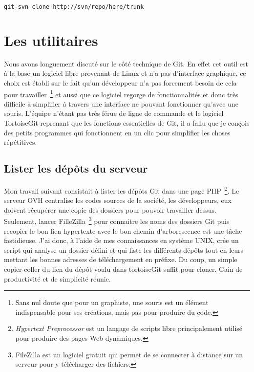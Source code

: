 \begin{lstlisting}
git-svn clone http://svn/repo/here/trunk
\end{lstlisting}

\section{Les utilitaires} %

Nous avons longuement discuté sur le côté technique de Git. En effet cet outil
est à la base un logiciel libre provenant de Linux et n'a pas d'interface
graphique, ce choix est établi sur le fait qu'un développeur n'a pas forcement
besoin de cela pour travailler\, \footnote{Sans nul doute que pour un
graphiste, une souris est un élément indispensable pour ses créations, mais pas
pour produire du code.} et aussi que ce logiciel regorge de fonctionnalités et
donc très difficile à simplifier à travers une interface ne pouvant fonctionner
qu'avec une souris. L'équipe n'étant pas très férue de ligne de commande et le
logiciel TortoiseGit reprenant que les fonctions essentielles de Git, il a
fallu que je conçois des petits programmes qui fonctionnent en un clic pour
simplifier les choses répétitives.


\subsection{Lister les dépôts du serveur}

Mon travail suivant consistait à lister les dépôts Git dans une page PHP\,
\footnote{\emph{Hypertext Preprocessor} est un langage de scripts libre
principalement utilisé pour produire des pages Web dynamiques.}. Le serveur OVH
centralise les codes sources de la société, les développeurs, eux doivent
récupérer une copie des dossiers pour pouvoir travailler dessus. Seulement,
lancer FilleZilla\, \footnote{FileZilla est un logiciel gratuit qui permet de
se connecter à distance sur un serveur pour y télécharger des fichiers.} pour
connaitre les noms des dossiers Git puis recopier le bon lien hypertexte avec
le bon chemin d'arborescence est une tâche fastidieuse.  J'ai donc, à l'aide de
mes connaissances en système UNIX, crée un script qui analyse un dossier défini
et qui liste les différents dépôts tout en leurs mettant les bonnes adresses de
téléchargement en préfixe. Du coup, un simple copier-coller du lien du dépôt
voulu dans tortoiseGit suffit pour cloner. Gain de productivité et de
simplicité réunie.

